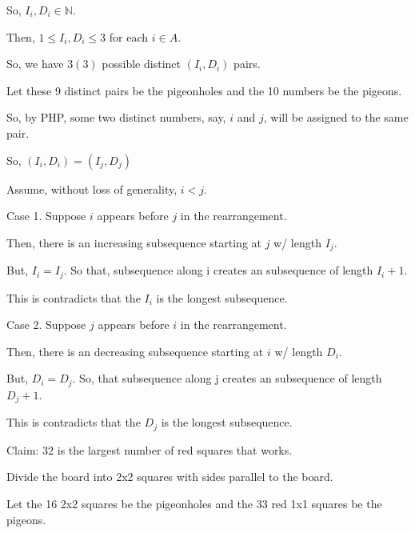 \documentclass[12pt]{article}
\begin{document}
So, $I_i, D_i \in{\mathbb{N}}$.

Then, $1 \leq{} I_i, D_i \leq 3$ for each $i \in A$.

So, we have $3(3)$ possible distinct $(I_i, D_i)$ pairs.

Let these 9 distinct pairs be the pigeonholes and the 10 numbers be the pigeons.

So, by PHP, some two distinct numbers, say, $i$ and $j$, will be assigned to the same pair.

So, $(I_i, D_i) = (I_j, D_j)$

Assume, without loss of generality, $i < j$.

Case 1. Suppose $i$ appears before $j$ in the rearrangement.

Then, there is an increasing subsequence starting at $j$ w/ length $I_j$.

But, $I_i = I_j$. So that, subsequence along i creates an subsequence of length $I_i + 1$.

This is contradicts that the $I_i$ is the longest subsequence.

\vspace{15pt}
Case 2. Suppose $j$ appears before $i$ in the rearrangement.

Then, there is an decreasing subsequence starting at $i$ w/ length $D_i$.

But, $D_i = D_j$. So, that subsequence along j creates an subsequence of length $D_j + 1$.

This is contradicts that the $D_j$ is the longest subsequence.

\newpage{}

Claim: 32 is the largest number of red squares that works.

Divide the board into 2x2 squares with sides parallel to the board.

Let the 16 2x2 squares be the pigeonholes and the 33 red 1x1 squares be the pigeons.
\end{document}
